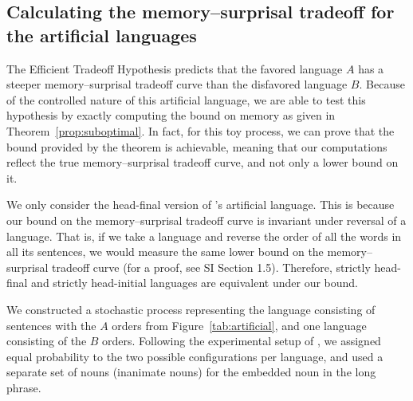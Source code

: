 \subsection{Calculating the memory--surprisal tradeoff for the artificial languages}

The Efficient Tradeoff Hypothesis predicts that the favored language $A$ has a steeper memory--surprisal tradeoff curve than the disfavored language $B$. Because of the controlled nature of this artificial language, we are able to test this hypothesis by exactly computing the bound on memory as given in Theorem~\ref{prop:suboptimal}. In fact, for this toy process, we can prove that the bound provided by the theorem is achievable, meaning that our computations reflect the true memory--surprisal tradeoff curve, and not only a lower bound on it.

We only consider the head-final version of \citet{fedzechkina-human-2017}'s artificial language. This is because our bound on the memory--surprisal tradeoff curve is invariant under reversal of a language. That is, if we take a language and reverse the order of all the words in all its sentences, we would measure the same lower bound on the memory--surprisal tradeoff curve (for a proof, see SI Section 1.5). Therefore, strictly head-final and strictly head-initial languages are equivalent under our bound. 


We constructed a stochastic process representing the language consisting of sentences with the $A$ orders from Figure~\ref{tab:artificial}, and one language consisting of the $B$ orders. Following the experimental setup of \cite{fedzechkina-human-2017}, we assigned equal probability to the two possible configurations per language, and used a separate set of nouns (inanimate nouns) for the embedded noun in the long phrase.


